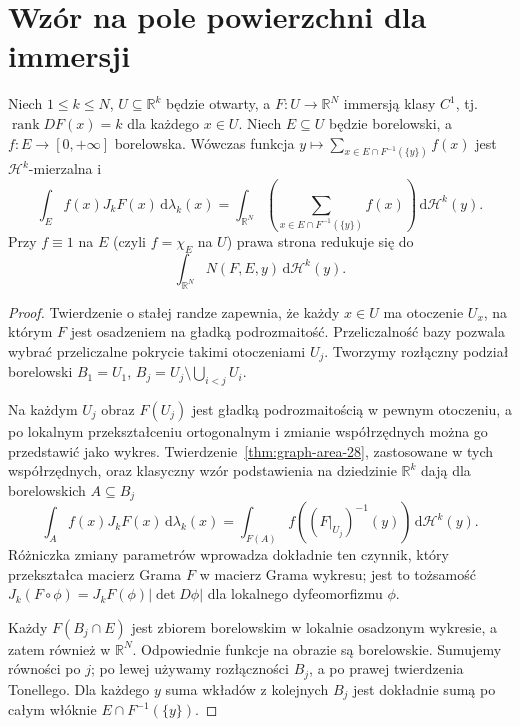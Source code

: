 \section{Wzór na pole powierzchni dla immersji}
\begin{twierdzenie}
\label{thm:immersion-area-28}
Niech $1\le k\le N$, $U\subseteq\mathbb R^k$
będzie otwarty, a $F:U\to\mathbb R^N$
immersją klasy $C^1$, tj.
$\operatorname{rank}DF(x)=k$ dla każdego $x\in U$.
Niech $E\subseteq U$ będzie borelowski,
a $f:E\to[0,+\infty]$ borelowska.
Wówczas funkcja
$y\mapsto\sum_{x\in E\cap F^{-1}(\{y\})}f(x)$
jest $\mathcal H^k$-mierzalna i
\begin{equation}\label{eq:area-immersion-28}
 \int_E f(x)J_kF(x)\,\mathrm d\lambda_k(x)
 =\int_{\mathbb R^N}\left(
 \sum_{x\in E\cap F^{-1}(\{y\})}f(x)\right)
 \,\mathrm d\mathcal H^k(y).
\end{equation}
Przy $f\equiv1$ na $E$ (czyli $f=\chi_E$ na $U$)
prawa strona redukuje się do
\[
 \int_{\mathbb R^N} N(F,E,y)\,\mathrm d\mathcal H^k(y).
\]
\end{twierdzenie}
\begin{proof}
Twierdzenie o stałej randze zapewnia, że każdy
$x\in U$ ma otoczenie $U_x$, na którym $F$
jest osadzeniem na gładką podrozmaitość.
Przeliczalność bazy pozwala wybrać przeliczalne
pokrycie takimi otoczeniami $U_j$. Tworzymy
rozłączny podział borelowski
$B_1=U_1$, $B_j=U_j\setminus\bigcup_{i<j}U_i$.

Na każdym $U_j$ obraz $F(U_j)$ jest gładką
podrozmaitością w pewnym otoczeniu, a po
lokalnym przekształceniu ortogonalnym i zmianie
współrzędnych można go przedstawić jako wykres.
Twierdzenie~\ref{thm:graph-area-28}, zastosowane
w tych współrzędnych, oraz klasyczny wzór
podstawienia na dziedzinie $\mathbb R^k$
dają dla borelowskich $A\subseteq B_j$
\[
 \int_A f(x)J_kF(x)\,\mathrm d\lambda_k(x)
 =\int_{F(A)}f((F|_{U_j})^{-1}(y))
 \,\mathrm d\mathcal H^k(y).
\]
Różniczka zmiany parametrów wprowadza dokładnie
ten czynnik, który przekształca macierz Grama
$F$ w macierz Grama wykresu; jest to tożsamość
$J_k(F\circ\phi)=J_kF(\phi)|\det D\phi|$
dla lokalnego dyfeomorfizmu $\phi$.

Każdy $F(B_j\cap E)$ jest zbiorem borelowskim
w lokalnie osadzonym wykresie, a zatem również
w $\mathbb R^N$. Odpowiednie funkcje na obrazie
są borelowskie. Sumujemy równości po $j$;
po lewej używamy rozłączności $B_j$, a po prawej
twierdzenia Tonellego. Dla każdego $y$ suma
wkładów z kolejnych $B_j$ jest dokładnie sumą
po całym włóknie $E\cap F^{-1}(\{y\})$.
\end{proof}

